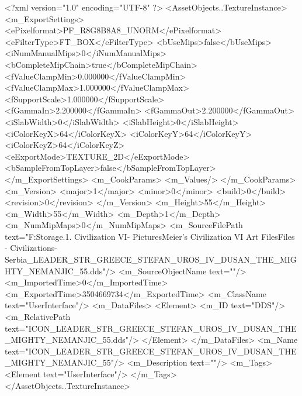 <?xml version="1.0" encoding="UTF-8" ?>
<AssetObjects..TextureInstance>
	<m_ExportSettings>
		<ePixelformat>PF_R8G8B8A8_UNORM</ePixelformat>
		<eFilterType>FT_BOX</eFilterType>
		<bUseMips>false</bUseMips>
		<iNumManualMips>0</iNumManualMips>
		<bCompleteMipChain>true</bCompleteMipChain>
		<fValueClampMin>0.000000</fValueClampMin>
		<fValueClampMax>1.000000</fValueClampMax>
		<fSupportScale>1.000000</fSupportScale>
		<fGammaIn>2.200000</fGammaIn>
		<fGammaOut>2.200000</fGammaOut>
		<iSlabWidth>0</iSlabWidth>
		<iSlabHeight>0</iSlabHeight>
		<iColorKeyX>64</iColorKeyX>
		<iColorKeyY>64</iColorKeyY>
		<iColorKeyZ>64</iColorKeyZ>
		<eExportMode>TEXTURE_2D</eExportMode>
		<bSampleFromTopLayer>false</bSampleFromTopLayer>
	</m_ExportSettings>
	<m_CookParams>
		<m_Values/>
	</m_CookParams>
	<m_Version>
		<major>1</major>
		<minor>0</minor>
		<build>0</build>
		<revision>0</revision>
	</m_Version>
	<m_Height>55</m_Height>
	<m_Width>55</m_Width>
	<m_Depth>1</m_Depth>
	<m_NumMipMaps>0</m_NumMipMaps>
	<m_SourceFilePath text="F:\Mod Storage\2.1. Civilization VI\Mods\Archive - Pictures\Sid Meier's Civilization VI Art Files\Art Files - Civilizations\Civilization - Serbia\ICON_LEADER_STR_GREECE_STEFAN_UROS_IV_DUSAN_THE_MIGHTY_NEMANJIC_55.dds"/>
	<m_SourceObjectName text=""/>
	<m_ImportedTime>0</m_ImportedTime>
	<m_ExportedTime>3504669734</m_ExportedTime>
	<m_ClassName text="UserInterface"/>
	<m_DataFiles>
		<Element>
			<m_ID text="DDS"/>
			<m_RelativePath text="ICON_LEADER_STR_GREECE_STEFAN_UROS_IV_DUSAN_THE_MIGHTY_NEMANJIC_55.dds"/>
		</Element>
	</m_DataFiles>
	<m_Name text="ICON_LEADER_STR_GREECE_STEFAN_UROS_IV_DUSAN_THE_MIGHTY_NEMANJIC_55"/>
	<m_Description text=""/>
	<m_Tags>
		<Element text="UserInterface"/>
	</m_Tags>
</AssetObjects..TextureInstance>

